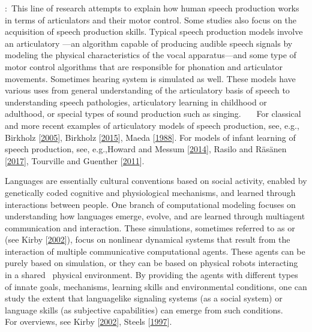 \documentclass[letterpaper,10pt,english]{jupyterBook}
\begin{document}
\sphinxAtStartPar
{}: This line of research attempts to
explain how human speech production works in terms of articulators and
their motor control. Some studies also focus on the acquisition of
speech production skills. Typical speech production models involve an
articulatory {\hyperref[\detokenize{Speech_Synthesis::doc}]{}}—an algorithm capable
of producing audible speech signals by modeling the physical
characteristics of the vocal apparatus—and some type of motor control
algorithms that are responsible for phonation and articulator movements.
Sometimes hearing system is simulated as well. These models have various
uses from general understanding of the articulatory basis of speech to
understanding speech pathologies, articulatory learning in childhood or
adulthood, or special types of sound production such as singing.    For classical and more recent examples of articulatory models of
speech production, see, e.g., Birkholz {[}\hyperlink{cite.References:id36}{2005}{]}, Birkholz  {[}\hyperlink{cite.References:id35}{2015}{]}, Maeda {[}\hyperlink{cite.References:id25}{1988}{]}. For models of infant learning of speech
production, see, e.g.,Howard and Messum {[}\hyperlink{cite.References:id32}{2014}{]}, Rasilo and Räsänen {[}\hyperlink{cite.References:id18}{2017}{]}, Tourville and Guenther {[}\hyperlink{cite.References:id13}{2011}{]}.

\sphinxAtStartPar
{} Languages are essentially cultural conventions based
on social activity, enabled by genetically coded cognitive and
physiological mechanisms, and learned through interactions between
people. One branch of computational modeling focuses on understanding
how languages emerge, evolve, and are learned through multi\sphinxhyphen{}agent
communication and interaction. These simulations, sometimes referred to
as  or  (see Kirby {[}\hyperlink{cite.References:id29}{2002}{]}), focus on
non\sphinxhyphen{}linear dynamical systems that result from the interaction of
multiple communicative computational agents. These agents can be purely
based on simulation, or they can be based on physical robots interacting
in a shared  physical environment. By providing the agents with
different types of innate goals, mechanisms, learning skills and
environmental conditions, one can study the extent that language\sphinxhyphen{}like
signaling systems (as a social system) or language skills (as subjective
capabilities) can emerge from such conditions.    For overviews, see Kirby {[}\hyperlink{cite.References:id29}{2002}{]}, Steels {[}\hyperlink{cite.References:id14}{1997}{]}.
\end{document}
